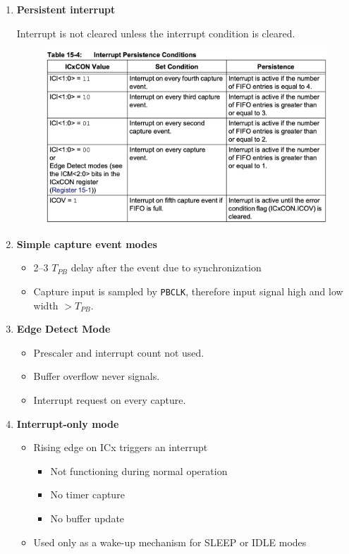 \documentclass[a4paper]{article}
\begin{document}
\begin{enumerate}[label = \arabic*.]
    \item \textbf{Persistent interrupt}
      \par Interrupt is not cleared unless the interrupt condition is cleared.
      \begin{figure}[H]
        \centering
        \includegraphics[width=0.6\linewidth]{Input_capture_persistent_condition.png}
        \label{fig:Input_capture_persistent_condition.png}
      \end{figure}

    \item \textbf{Simple capture event modes}
      \begin{itemize}[leftmargin = 1cm]
        \item 2--3 \( T_{PB} \) delay after the event due to synchronization
        \item Capture input is sampled by \verb|PBCLK|, therefore input signal high and low width \( >T_{PB} \).
      \end{itemize}

    \item \textbf{Edge Detect Mode}
      \begin{itemize}[leftmargin = 1cm]
        \item Prescaler and interrupt count not used.
        \item Buffer overflow never signals.
        \item Interrupt request on every capture.
      \end{itemize}

    \item \textbf{Interrupt-only mode}
      \begin{itemize}[leftmargin = 1cm]
        \item Rising edge on ICx triggers an interrupt
          \begin{itemize}[leftmargin = 1cm]
            \item Not functioning during normal operation
            \item No timer capture
            \item No buffer update
          \end{itemize}
        \item Used only as a wake-up mechanism for SLEEP or IDLE modes
      \end{itemize}


\end{enumerate}
\end{document}
